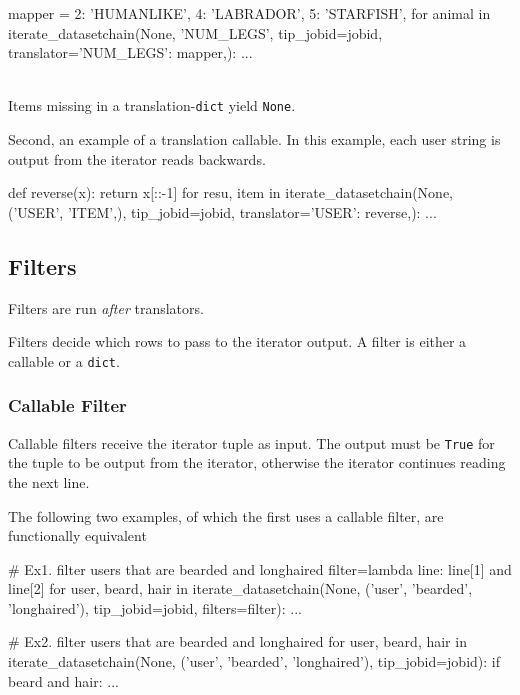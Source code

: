 \begin{python}
mapper = {2: 'HUMANLIKE', 4: 'LABRADOR', 5: 'STARFISH',}
for animal in iterate_datasetchain(None, 'NUM_LEGS', tip_jobid=jobid,
                                     translator={'NUM_LEGS': mapper,}):
    ...
\end{python}
\\
Items missing in a translation-\texttt{dict} yield \texttt{None}.

Second, an example of a translation callable.  In this example, each
user string is output from the iterator reads backwards.

\begin{python}
def reverse(x):
    return x[::-1]
for resu, item in iterate_datasetchain(None, ('USER', 'ITEM',), tip_jobid=jobid,
                                       translator={'USER': reverse,}):
    ...
\end{python}



\subsection{Filters}

Filters are run \emph{after} translators.

Filters decide which rows to pass to the iterator output.  A filter is
either a callable or a \texttt{dict}.


\subsubsection*{Callable Filter}

Callable filters receive the iterator tuple as input.  The output must
be \texttt{True} for the tuple to be output from the iterator,
otherwise the iterator continues reading the next line.

The following two examples, of which the first uses a callable filter,
are functionally equivalent

\begin{python}
# Ex1.  filter users that are bearded and longhaired
filter=lambda line: line[1] and line[2]
for user, beard, hair in iterate_datasetchain(None, ('user', 'bearded', 'longhaired'),
                                       tip_jobid=jobid, filters=filter):
    ...

# Ex2.  filter users that are bearded and longhaired
for user, beard, hair in iterate_datasetchain(None, ('user', 'bearded', 'longhaired'),
                                       tip_jobid=jobid):
    if beard and hair:
        ...
\end{python}




